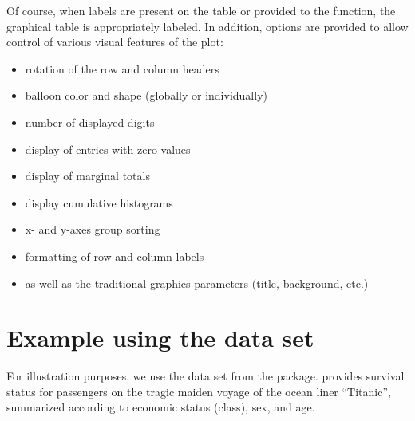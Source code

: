 \documentclass[a4paper]{report}
\begin{document}
\begin{article}
Of course, when labels are present on the table or provided to the
function, the graphical table is appropriately labeled.  In
addition, options are provided to allow control of various visual features
of the plot:

\begin{itemize}
  \item rotation of the row and column headers
  \item balloon color and shape (globally or individually)
  \item number of displayed digits
  \item display of entries with zero values
  \item display of marginal totals
  \item display cumulative histograms
  \item x- and y-axes group sorting
  \item formatting of row and column labels
  \item as well as the traditional graphics parameters (title,
    background, etc.)
\end{itemize}

\section*{Example using the  data set}

For illustration purposes, we use the  data set from
the  package.   provides survival status
for passengers on the tragic maiden voyage of the ocean liner
``Titanic'', summarized according to economic status (class), sex, and
age.






\end{article}
\end{document}
